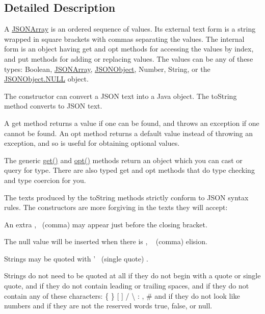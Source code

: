 \subsection{Detailed Description}
A \hyperlink{classorg_1_1json_1_1JSONArray}{J\-S\-O\-N\-Array} is an ordered sequence of values. Its external text form is a string wrapped in square brackets with commas separating the values. The internal form is an object having {\ttfamily get} and {\ttfamily opt} methods for accessing the values by index, and {\ttfamily put} methods for adding or replacing values. The values can be any of these types\-: {\ttfamily Boolean}, {\ttfamily \hyperlink{classorg_1_1json_1_1JSONArray}{J\-S\-O\-N\-Array}}, {\ttfamily \hyperlink{classorg_1_1json_1_1JSONObject}{J\-S\-O\-N\-Object}}, {\ttfamily Number}, {\ttfamily String}, or the {\ttfamily \hyperlink{classorg_1_1json_1_1JSONObject_a01c74a31a1abfd34ab13beb9347855ac}{J\-S\-O\-N\-Object.\-N\-U\-L\-L} object}. 

The constructor can convert a J\-S\-O\-N text into a Java object. The {\ttfamily to\-String} method converts to J\-S\-O\-N text. 

A {\ttfamily get} method returns a value if one can be found, and throws an exception if one cannot be found. An {\ttfamily opt} method returns a default value instead of throwing an exception, and so is useful for obtaining optional values. 

The generic {\ttfamily \hyperlink{classorg_1_1json_1_1JSONArray_a3a8413753f53e0c0a5e008816c915eae}{get()}} and {\ttfamily \hyperlink{classorg_1_1json_1_1JSONArray_a19aa83c80cded3d0a252c212ceca7954}{opt()}} methods return an object which you can cast or query for type. There are also typed {\ttfamily get} and {\ttfamily opt} methods that do type checking and type coercion for you. 

The texts produced by the {\ttfamily to\-String} methods strictly conform to J\-S\-O\-N syntax rules. The constructors are more forgiving in the texts they will accept\-: 
\begin{DoxyItemize}
\item An extra {\ttfamily ,}~
\footnotesize (comma)
\normalsize  may appear just before the closing bracket. 
\item The {\ttfamily null} value will be inserted when there is {\ttfamily ,} ~
\footnotesize (comma)
\normalsize  elision. 
\item Strings may be quoted with {\ttfamily '}~
\footnotesize (single quote)
\normalsize . 
\item Strings do not need to be quoted at all if they do not begin with a quote or single quote, and if they do not contain leading or trailing spaces, and if they do not contain any of these characters\-: {\ttfamily \{ \} \mbox{[} \mbox{]} / \textbackslash{} \-: , \#} and if they do not look like numbers and if they are not the reserved words {\ttfamily true}, {\ttfamily false}, or {\ttfamily null}. 
\end{DoxyItemize}

